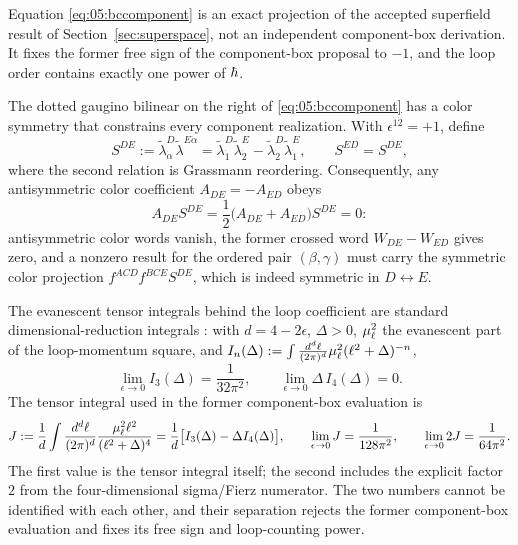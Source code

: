 \begin{remark}\label{rem:05:status}
Equation \eqref{eq:05:bccomponent} is an exact projection of the accepted
superfield result of Section~\ref{sec:superspace}, not an independent
component-box derivation. It fixes the former free sign of the component-box
proposal to $-1$, and the loop order contains exactly one power of $\hbar$.
\end{remark}

The dotted gaugino bilinear on the right of \eqref{eq:05:bccomponent} has a
color symmetry that constrains every component realization. With
$\epsilon^{\dot1\dot2}=+1$, define
\begin{equation}\label{eq:05:gauginoS}
S^{DE}:=\widetilde\lambda_{\dot\alpha}^{D}\widetilde\lambda^{E\dot\alpha}
=\widetilde\lambda_{\dot1}^{D}\widetilde\lambda_{\dot2}^{E}
-\widetilde\lambda_{\dot2}^{D}\widetilde\lambda_{\dot1}^{E},
\qquad S^{ED}=S^{DE},
\end{equation}
where the second relation is Grassmann reordering. Consequently, any
antisymmetric color coefficient $A_{DE}=-A_{ED}$ obeys
\begin{equation}\label{eq:05:antisymm}
A_{DE}S^{DE}=\frac12\big(A_{DE}+A_{ED}\big)S^{DE}=0:
\end{equation}
antisymmetric color words vanish, the former crossed word $W_{DE}-W_{ED}$
gives zero, and a nonzero result for the ordered pair $(\beta,\gamma)$ must
carry the symmetric color projection $f^{ACD}f^{BCE}S^{DE}$, which is indeed
symmetric in $D\leftrightarrow E$.

The evanescent tensor integrals behind the loop coefficient are standard
dimensional-reduction integrals \cite{SiegelDRED}: with $d=4-2\epsilon$,
$\Delta>0$, $\mu_\ell^{2}$ the evanescent part of the loop-momentum square, and
$I_n(\Delta):=\int\frac{d^{d}\ell}{(2\pi)^{d}}\mu_\ell^{2}(\ell^{2}+\Delta)^{-n}$,
\begin{equation}\label{eq:05:masterI}
\lim_{\epsilon\to0}I_3(\Delta)=\frac{1}{32\pi^{2}},
\qquad\lim_{\epsilon\to0}\Delta\,I_4(\Delta)=0.
\end{equation}
The tensor integral used in the former component-box evaluation is
\begin{equation}\label{eq:05:Jint}
J:=\frac1d\int\frac{d^{d}\ell}{(2\pi)^{d}}\frac{\mu_\ell^{2}\ell^{2}}{(\ell^{2}+\Delta)^{4}}
=\frac1d\big[I_3(\Delta)-\Delta I_4(\Delta)\big],
\qquad
\lim_{\epsilon\to0}J=\frac{1}{128\pi^{2}},\qquad\lim_{\epsilon\to0}2J=\frac{1}{64\pi^{2}}.
\end{equation}
The first value is the tensor integral itself; the second includes the
explicit factor $2$ from the four-dimensional sigma/Fierz numerator. The two
numbers cannot be identified with each other, and their separation rejects the
former component-box evaluation and fixes its free sign and loop-counting
power.

